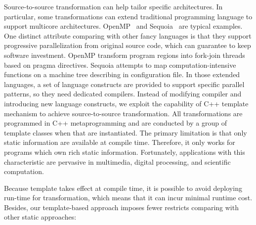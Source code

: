 \documentclass[10pt, conference, compsocconf]{IEEEtran}
\begin{document}
Source-to-source transformation can help tailor specific
architectures. In particular, some transformations can extend
traditional programming language to support multicore
architectures. OpenMP~\cite{openmp} and Sequoia~\cite{sequoia, sequoia-compiler}
are typical examples. One distinct attribute comparing with other
fancy languages is that they
support progressive parallelization from original source code, which
can guarantee to keep software investment. OpenMP transform program regions into fork-join threads based on
pragma directives. Sequoia attempts to map computation-intensive functions
on a machine tree describing in configuration file. In those
extended languages,  a set of language
constructs are provided to support specific parallel patterns, so they
need dedicated compilers. Instead of modifying compiler and introducing new language constructs, we exploit
the capability of C++ template mechanism to achieve source-to-source
transformation. All transformations are programmed in C++ metaprogramming
\cite{tempmetaprog} and are conducted by a group of template classes
when that are instantiated. The primary limitation is that only static
information are available at compile time. Therefore, it only works for programs which own rich static information. Fortunately, applications with this characteristic are pervasive in multimedia, digital processing, and scientific computation.

Because template takes effect at compile time, it is possible to avoid
deploying run-time for transformation, which means that it can incur minimal
runtime cost. Besides, our template-based approach imposes fewer restricts comparing with other static approaches:
\end{document}
